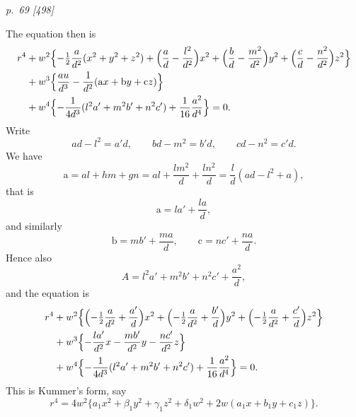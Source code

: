 \documentclass[11pt,a4paper]{article}
\newcommand{\pagemarker}[2]{\clearpage\noindent\textit{p.~#1 [#2]}\par\medskip}
\newcommand{\half}{\tfrac{1}{2}}
\begin{document}
\pagemarker{69}{498}
The equation then is
\[
\begin{aligned}
r^4
&+w^2\Bigl\{-\half\frac{a}{d^2}(x^2+y^2+z^2)
+\Bigl(\frac{a}{d}-\frac{l^2}{d^2}\Bigr)x^2
+\Bigl(\frac{b}{d}-\frac{m^2}{d^2}\Bigr)y^2
+\Bigl(\frac{c}{d}-\frac{n^2}{d^2}\Bigr)z^2\Bigr\}\\
&+w^3\Bigl\{\frac{au}{d^3}
-\frac1{d^2}(\mathrm{a}x+\mathrm{b}y+\mathrm{c}z)\Bigr\}\\
&+w^4\Bigl\{-\frac1{4d^3}(l^2a'+m^2b'+n^2c')
+\frac1{16}\frac{a^2}{d^4}\Bigr\}=0.
\end{aligned}
\]
Write
\[
  ad-l^2=a'd,\qquad bd-m^2=b'd,\qquad cd-n^2=c'd.
\]
We have
\[
  \mathrm{a}=al+hm+gn
  =al+\frac{lm^2}{d}+\frac{ln^2}{d}
  =\frac ld(ad-l^2+a),
\]
that is
\[
  \mathrm{a}=la'+\frac{la}{d},
\]
and similarly
\[
  \mathrm{b}=mb'+\frac{ma}{d},\qquad
  \mathrm{c}=nc'+\frac{na}{d}.
\]
Hence also
\[
  A=l^2a'+m^2b'+n^2c'+\frac{a^2}{d},
\]
and the equation is
\[
\begin{aligned}
r^4
&+w^2\Bigl\{\Bigl(-\half\frac{a}{d^2}+\frac{a'}d\Bigr)x^2
+\Bigl(-\half\frac{a}{d^2}+\frac{b'}d\Bigr)y^2
+\Bigl(-\half\frac{a}{d^2}+\frac{c'}d\Bigr)z^2\Bigr\}\\
&+w^3\Bigl\{-\frac{la'}{d^2}x-\frac{mb'}{d^2}y-\frac{nc'}{d^2}z\Bigr\}\\
&+w^4\Bigl\{-\frac1{4d^3}(l^2a'+m^2b'+n^2c')+\frac1{16}\frac{a^2}{d^4}\Bigr\}=0.
\end{aligned}
\]
This is Kummer's form, say
\[
  r^4=4w^2\{a_1x^2+\beta_1y^2+\gamma_1z^2+\delta_1w^2
  +2w(a_1x+b_1y+c_1z)\}.
\]
\end{document}
